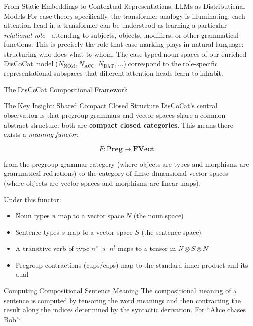 \documentclass[
  ignorenonframetext,
]{beamer}
\providecommand{\tightlist}{%
  \setlength{\itemsep}{0pt}\setlength{\parskip}{0pt}}
\begin{document}
\begin{frame}{From Static Embeddings to Contextual Representations: LLMs
as Distributional Models}
For case theory specifically, the transformer analogy is illuminating:
each attention head in a transformer can be understood as learning a
particular \emph{relational role}---attending to subjects, objects,
modifiers, or other grammatical functions. This is precisely the role
that case marking plays in natural language: structuring
who-does-what-to-whom. The case-typed noun spaces of our enriched
DisCoCat model
(\(N_{\text{NOM}}, N_{\text{ACC}}, N_{\text{DAT}}, \ldots\)) correspond
to the role-specific representational subspaces that different attention
heads learn to inhabit.
\end{frame}

\begin{frame}{The DisCoCat Compositional Framework}
\protect{}\label{the-discocat-compositional-framework}
\begin{block}{The Key Insight: Shared Compact Closed Structure}
\protect{}\label{the-key-insight-shared-compact-closed-structure}
DisCoCat's central observation is that pregroup grammars and vector
spaces share a common abstract structure: both are \textbf{compact
closed categories}. This means there exists a \emph{meaning functor}:

\[F: \mathbf{Preg} \to \mathbf{FVect} \tag{4.1}\]

from the pregroup grammar category (where objects are types and
morphisms are grammatical reductions) to the category of
finite-dimensional vector spaces (where objects are vector spaces and
morphisms are linear maps).

Under this functor:

\begin{itemize}
\tightlist
\item
  Noun types \(n\) map to a vector space \(N\) (the noun space)
\item
  Sentence types \(s\) map to a vector space \(S\) (the sentence space)
\item
  A transitive verb of type \(n^r \cdot s \cdot n^l\) maps to a tensor
  in \(N \otimes S \otimes N\)
\item
  Pregroup contractions (cups/caps) map to the standard inner product
  and its dual
\end{itemize}
\end{block}

\begin{block}{Computing Compositional Sentence Meaning}
\protect{}\label{computing-compositional-sentence-meaning}
The compositional meaning of a sentence is computed by tensoring the
word meanings and then contracting the result along the indices
determined by the syntactic derivation. For ``Alice chases Bob'':


\end{block}
\end{frame}
\end{document}
